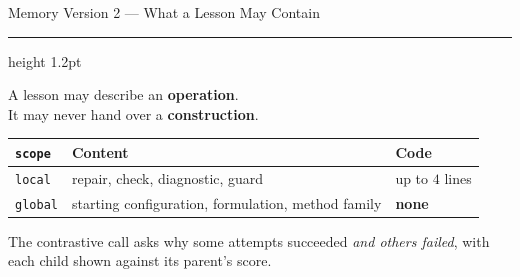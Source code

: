 \documentclass[aspectratio=169]{beamer}
\newcommand{\titlerule}{{\color{titledred}\hrule height 1.2pt}}
\begin{document}
\begin{frame}{Memory Version 2 --- What a Lesson May Contain}
\vspace{0.1em}
\titlerule
\vspace{1.3em}

\begin{center}
\begin{minipage}{0.86\linewidth}
\begin{block}{}
\centering\large
A lesson may describe an \textbf{operation}. \\
It may never hand over a \textbf{construction}.
\end{block}
\end{minipage}
\end{center}

\vspace{1.3em}
{\small
\begin{center}
\begin{tabular}{lll}
\toprule
\texttt{scope} & Content & Code \\
\midrule
\texttt{local}  & repair, check, diagnostic, guard & up to $4$ lines \\
\texttt{global} & starting configuration, formulation, method family & \textbf{none} \\
\bottomrule
\end{tabular}
\end{center}
}

\vspace{0.6em}
{\small The contrastive call asks why some attempts succeeded \emph{and others
failed}, with each child shown against its parent's score.}
\end{frame}
\end{document}
